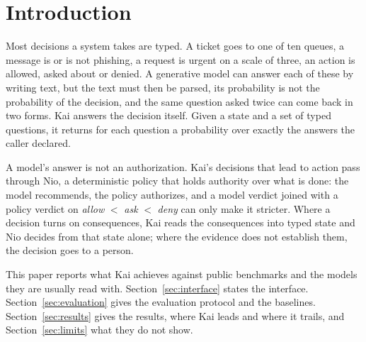 \section{Introduction}
\label{sec:intro}

Most decisions a system takes are typed. A ticket goes to one of ten queues, a
message is or is not phishing, a request is urgent on a scale of three, an
action is allowed, asked about or denied. A generative model can answer each of
these by writing text, but the text must then be parsed, its probability is not
the probability of the decision, and the same question asked twice can come
back in two forms. Kai answers the decision itself. Given a state and a set of
typed questions, it returns for each question a probability over exactly the
answers the caller declared.

A model's answer is not an authorization. Kai's decisions that lead to action
pass through Nio, a deterministic policy that holds authority over what is
done: the model recommends, the policy authorizes, and a model verdict joined
with a policy verdict on \emph{allow} $<$ \emph{ask} $<$ \emph{deny} can only
make it stricter. Where a decision turns on consequences, Kai reads the
consequences into typed state and Nio decides from that state alone; where the
evidence does not establish them, the decision goes to a person.

This paper reports what Kai achieves against public benchmarks and the models
they are usually read with. Section~\ref{sec:interface} states the interface.
Section~\ref{sec:evaluation} gives the evaluation protocol and the baselines.
Section~\ref{sec:results} gives the results, where Kai leads and where it
trails, and Section~\ref{sec:limits} what they do not show.
